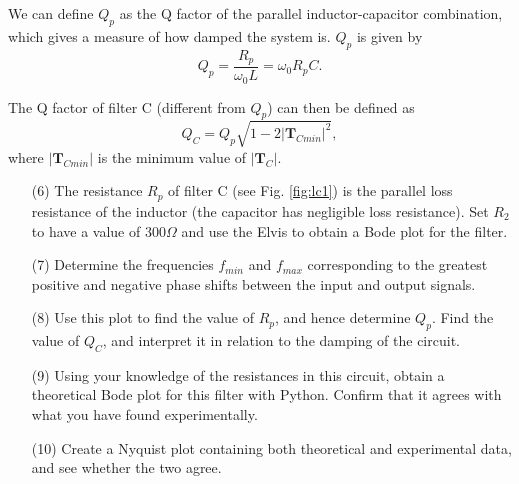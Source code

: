 \documentclass{article}
\begin{document}
We can define $Q_p$ as the Q factor of the parallel inductor-capacitor
combination, which gives a measure of how damped the system is. $Q_p$
is given by
\begin{equation}
Q_p=\frac{R_p}{\omega_0 L}=\omega_0 R_p C.
\end{equation}

The Q factor of filter C (different from $Q_p$) can then be defined as
\begin{equation}
  Q_C=Q_p\sqrt{1-2|\mathbf{T}_{Cmin}|^2},
\end{equation}
where $|\mathbf{T}_{Cmin}|$ is the minimum value of $|\mathbf{T}_C|$.

\begin{enumerate}
\item[(6)] The resistance $R_p$ of filter C (see Fig. \ref{fig:lc1})
  is the parallel loss resistance of the inductor (the capacitor has
  negligible loss resistance).  Set $R_2$ to have a value of
  $300\Omega$ and use the Elvis to obtain a Bode plot for the filter.
  
\item[(7)] Determine the frequencies $f_{min}$ and $f_{max}$
  corresponding to the greatest positive and negative phase shifts
  between the input and output signals. %
  
\item[(8)] Use this plot to find the value of $R_p$, and hence
  determine $Q_p$. Find the value of $Q_C$, and interpret it in
  relation to the damping of the circuit.

\item[(9)] Using your knowledge of the resistances in this circuit,
  obtain a theoretical Bode plot for this filter with Python. Confirm
  that it agrees with what you have found experimentally.

\item[(10)] Create a Nyquist plot containing both theoretical and
  experimental data, and see whether the two agree.
\end{enumerate}
\end{document}
